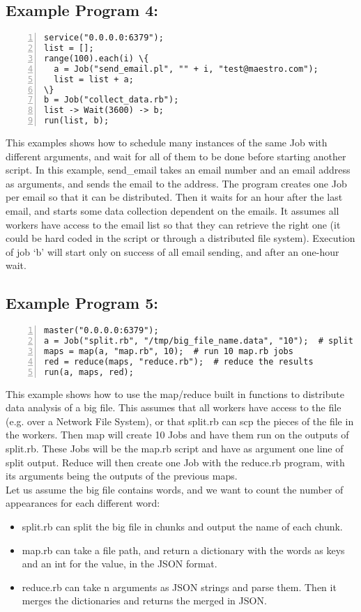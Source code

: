\subsection*{Example Program 4:}
\begin{Verbatim}[numbers=left,commandchars=\\\{\}]
service("0.0.0.0:6379");
list = [];
range(100).each(i) \{
  a = Job("send_email.pl", "" + i, "test@maestro.com");
  list = list + a;
\}
b = Job("collect_data.rb");
list -> Wait(3600) -> b;
run(list, b);
\end{Verbatim}

This examples shows how to schedule many instances of the same Job with different
arguments, and wait for all of them to be done before starting another script.
In this example, send\_email takes an email number and an email address as arguments,
and sends the email to the address. The program creates one Job per email so that it
can be distributed. Then it waits for an hour after the last email, and starts some data
collection dependent on the emails. It assumes all workers have access to the email list
so that they can retrieve the right one (it could be hard coded in the script or through a distributed
file system).
Execution of job `b' will start only on success of all email sending,
and after an one-hour wait.

\subsection*{Example Program 5:}
\begin{Verbatim}[numbers=left,commandchars=\\\{\}]
master("0.0.0.0:6379");
a = Job("split.rb", "/tmp/big_file_name.data", "10");  # split file in 10
maps = map(a, "map.rb", 10);  # run 10 map.rb jobs
red = reduce(maps, "reduce.rb");  # reduce the results
run(a, maps, red);
\end{Verbatim}

This example shows how to use the map/reduce built in functions to distribute data
analysis of a big file. This assumes that all workers have access to the file (e.g. over a
 Network File System), or that split.rb can scp the pieces of the file in the workers.
Then map will create 10 Jobs and have them run on the outputs of split.rb. These Jobs will be the map.rb
script and have as argument one line of split output. Reduce will then create one Job
with the reduce.rb program, with its arguments being the outputs of the previous
maps.\\
Let us assume the big file contains words, and we want to count the number of appearances for
each different word:
\begin{itemize}
  \item split.rb can split the big file in chunks and output the name of each chunk.
  \item map.rb can take a file path, and return a dictionary with the words as keys
    and an int for the value, in the JSON format.
  \item reduce.rb can take n arguments as JSON strings and parse them. Then it
    merges the dictionaries and returns the merged in JSON.
\end{itemize}


